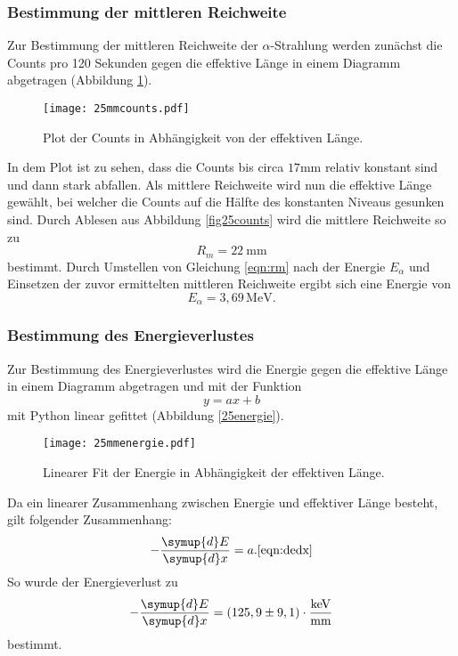 \subsubsection{Bestimmung der mittleren Reichweite}
Zur Bestimmung der mittleren Reichweite der $\alpha$-Strahlung werden zunächst die Counts pro 120 Sekunden gegen die effektive Länge in einem Diagramm abgetragen (Abbildung \ref{fig:25counts}).
\begin{figure}
  \centering
  \texttt{[image: 25mmcounts.pdf]}
  \caption{Plot der Counts in Abhängigkeit von der effektiven Länge.}
  \label{fig:25counts}
\end{figure}
In dem Plot ist zu sehen, dass die Counts bis circa $17 \si{\milli\metre}$ relativ konstant sind und dann stark abfallen. Als mittlere Reichweite wird nun die effektive Länge
gewählt, bei welcher die Counts auf die Hälfte des konstanten Niveaus gesunken sind. Durch Ablesen aus Abbildung \ref{fig25counts} wird die mittlere Reichweite so zu
\begin{equation*}
  R_m = 22 \: \si{\milli\metre}
 \end{equation*}
bestimmt. Durch Umstellen von Gleichung \ref{eqn:rm} nach der Energie $E_{\alpha}$ und Einsetzen der zuvor ermittelten mittleren Reichweite ergibt sich eine
Energie von
\begin{equation*}
  E_{\alpha} = 3,69 \, \si{\mega\electronvolt}.
\end{equation*}
\subsubsection{Bestimmung des Energieverlustes}
Zur Bestimmung des Energieverlustes wird die Energie gegen die effektive Länge in einem Diagramm abgetragen und mit der Funktion
\begin{equation*}
  y= ax+b
\end{equation*}
 mit Python \cite{numpy} \cite{scipy} linear gefittet (Abbildung \ref{25energie}).
 \begin{figure}
   \centering
   \texttt{[image: 25mmenergie.pdf]}
   \caption{Linearer Fit der Energie in Abhängigkeit der effektiven Länge.\cite{matplotlib}}
   \label{fig:25energie}
 \end{figure}
 Da ein linearer Zusammenhang zwischen Energie und effektiver Länge besteht, gilt folgender Zusammenhang:
 \begin{equation}
   - \frac{\symup{d} E}{\symup{d}x} = a .
   \ref{eqn:dedx}
 \end{equation}
 So wurde der Energieverlust zu
 \begin{equation*}
   - \frac{\symup{d} E}{\symup{d}x} = (125,9 \pm 9,1) \cdot \si{\kilo\electronvolt\per\milli\metre}
 \end{equation*}
 bestimmt.
